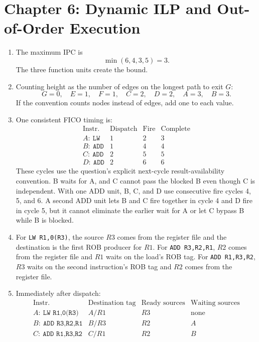 \documentclass[11pt]{article}
\begin{document}
\section{Chapter 6: Dynamic ILP and Out-of-Order Execution}
\begin{enumerate}
    \item The maximum IPC is
    \[
        \min(6,4,3,5)=3.
    \]
    The three function units create the bound.

    \item Counting height as the number of edges on the longest path to exit \(G\):
    \[
        G=0,\quad E=1,\quad F=1,\quad C=2,\quad D=2,\quad A=3,\quad B=3.
    \]
    If the convention counts nodes instead of edges, add one to each value.

    \item One consistent FICO timing is:
    \[
    \begin{array}{c|c|c|c}
        \text{Instr.} & \text{Dispatch} & \text{Fire} & \text{Complete}\\
        \hline
        A:\ \texttt{LW} & 1 & 2 & 3\\
        B:\ \texttt{ADD} & 1 & 4 & 4\\
        C:\ \texttt{ADD} & 2 & 5 & 5\\
        D:\ \texttt{ADD} & 2 & 6 & 6
    \end{array}
    \]
    These cycles use the question's explicit next-cycle result-availability convention.
    B waits for A, and C cannot pass the blocked B even though C is independent.
    With one ADD unit, B, C, and D use consecutive fire cycles 4, 5, and 6.
    A second ADD unit lets B and C fire together in cycle 4 and D fire in cycle 5, but it cannot eliminate the earlier wait for A or let C bypass B while B is blocked.

    \item For \texttt{LW R1,0(R3)}, the source \(R3\) comes from the register file and the destination is the first ROB producer for \(R1\).
    For \texttt{ADD R3,R2,R1}, \(R2\) comes from the register file and \(R1\) waits on the load's ROB tag.
    For \texttt{ADD R1,R3,R2}, \(R3\) waits on the second instruction's ROB tag and \(R2\) comes from the register file.

    \item Immediately after dispatch:
    \[
    \begin{array}{c|c|c|c}
        \text{Instr.} & \text{Destination tag} & \text{Ready sources} & \text{Waiting sources}\\
        \hline
        A:\ \texttt{LW R1,0(R3)} & A/R1 & R3 & \text{none}\\
        B:\ \texttt{ADD R3,R2,R1} & B/R3 & R2 & A\\
        C:\ \texttt{ADD R1,R3,R2} & C/R1 & R2 & B
    \end{array}
    \]


\end{enumerate}
\end{document}
